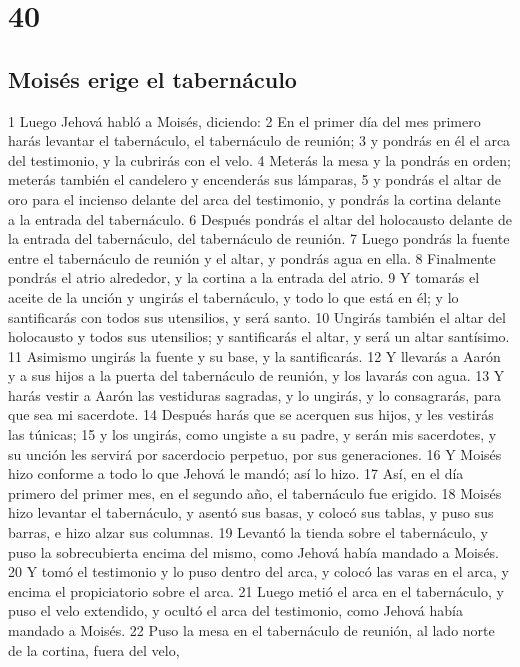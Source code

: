 \chapter{40}

\section*{Moisés erige el tabernáculo}

1 Luego Jehová habló a Moisés, diciendo:
2 En el primer día del mes primero harás levantar el tabernáculo, el tabernáculo de reunión;
3 y pondrás en él el arca del testimonio, y la cubrirás con el velo.
4 Meterás la mesa y la pondrás en orden; meterás también el candelero y encenderás sus lámparas,
5 y pondrás el altar de oro para el incienso delante del arca del testimonio, y pondrás la cortina delante a la entrada del tabernáculo.
6 Después pondrás el altar del holocausto delante de la entrada del tabernáculo, del tabernáculo de reunión.
7 Luego pondrás la fuente entre el tabernáculo de reunión y el altar, y pondrás agua en ella.
8 Finalmente pondrás el atrio alrededor, y la cortina a la entrada del atrio.
9 Y tomarás el aceite de la unción y ungirás el tabernáculo, y todo lo que está en él; y lo santificarás con todos sus utensilios, y será santo.
10 Ungirás también el altar del holocausto y todos sus utensilios; y santificarás el altar, y será un altar santísimo.
11 Asimismo ungirás la fuente y su base, y la santificarás.
12 Y llevarás a Aarón y a sus hijos a la puerta del tabernáculo de reunión, y los lavarás con agua.
13 Y harás vestir a Aarón las vestiduras sagradas, y lo ungirás, y lo consagrarás, para que sea mi sacerdote.
14 Después harás que se acerquen sus hijos, y les vestirás las túnicas;
15 y los ungirás, como ungiste a su padre, y serán mis sacerdotes, y su unción les servirá por sacerdocio perpetuo, por sus generaciones.
16 Y Moisés hizo conforme a todo lo que Jehová le mandó; así lo hizo.
17 Así, en el día primero del primer mes, en el segundo año, el tabernáculo fue erigido.
18 Moisés hizo levantar el tabernáculo, y asentó sus basas, y colocó sus tablas, y puso sus barras, e hizo alzar sus columnas.
19 Levantó la tienda sobre el tabernáculo, y puso la sobrecubierta encima del mismo, como Jehová había mandado a Moisés.
20 Y tomó el testimonio y lo puso dentro del arca, y colocó las varas en el arca, y encima el propiciatorio sobre el arca.
21 Luego metió el arca en el tabernáculo, y puso el velo extendido, y ocultó el arca del testimonio, como Jehová había mandado a Moisés.
22 Puso la mesa en el tabernáculo de reunión, al lado norte de la cortina, fuera del velo,
